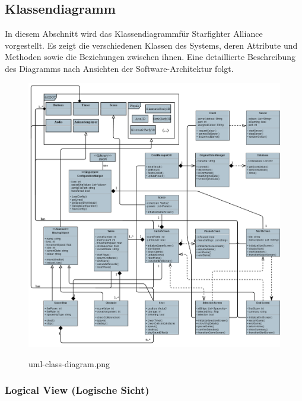 \documentclass[10pt]{article}
\begin{document}
\newpage
	\subsection{Klassendiagramm}

In diesem Abschnitt wird das Klassendiagramm\footnotemark[4] für Starfighter Alliance vorgestellt. Es zeigt die verschiedenen Klassen des Systems, deren Attribute und Methoden sowie die Beziehungen zwischen ihnen. Eine detaillierte Beschreibung des Diagramms nach Ansichten der Software-Architektur folgt.


\begin{figure}
\centering
	\includegraphics[width=1\textwidth]{../../../images/Pflichtenheft_Assets/uml-class-diagram/uml-class-diagram.png}\\
	\caption{uml-class-diagram.png}
\end{figure}
\newpage
\subsubsection{Logical View (Logische Sicht)}
\end{document}
